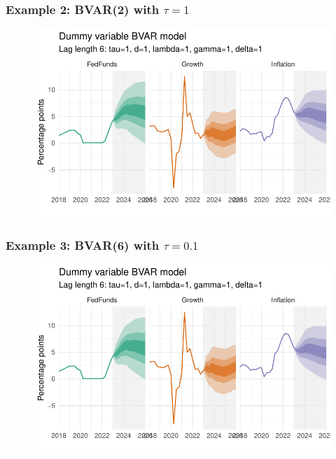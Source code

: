 \documentclass[
  letterpaper,
]{book}
\begin{document}
\hypertarget{example-2-bvar2-with-tau1}{%
\subsubsection{\texorpdfstring{Example 2: BVAR(2) with
\(\tau=1\)}{Example 2: BVAR(2) with \textbackslash tau=1}}\label{example-2-bvar2-with-tau1}}

\begin{figure}

{\centering \includegraphics{BVAR_files/figure-pdf/estim-1.pdf}

}

\end{figure}

\hypertarget{example-3-bvar6-with-tau0.1}{%
\subsubsection{\texorpdfstring{Example 3: BVAR(6) with
\(\tau=0.1\)}{Example 3: BVAR(6) with \textbackslash tau=0.1}}\label{example-3-bvar6-with-tau0.1}}

\begin{figure}

{\centering \includegraphics{BVAR_files/figure-pdf/estim-1.pdf}

}

\end{figure}
\end{document}
